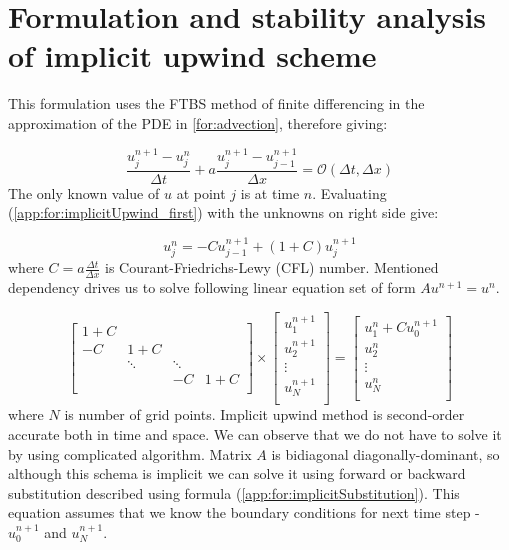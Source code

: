 \section{Formulation and stability analysis of implicit upwind scheme} \label{app:implicit}
	This formulation uses the FTBS method of finite differencing in the approximation of the PDE in \ref{for:advection}, therefore giving:
	
	\begin{equation}
		\label{app:for:implicitUpwind_first}
		\frac{u_j^{n+1} - u_j^n}{\Delta t} + a\frac{u_j^{n+1} - u_{j-1}^{n+1}}{\Delta x} = \mathcal{O}(\Delta t, \Delta x)
	\end{equation}	
	The only known value of $u$ at point $j$ is at time $n$. Evaluating (\ref{app:for:implicitUpwind_first}) with the unknowns on right side give:
	
	\begin{equation}
		\label{app:for:implicitUpwind_solution}
		u_j^n = -Cu_{j-1}^{n+1} + (1+C)u_j^{n+1}
	\end{equation}
	where $C=a\frac{\Delta t}{\Delta x}$ is Courant-Friedrichs-Lewy (CFL) number.
	Mentioned dependency drives us to solve following linear equation set of form $Au^{n+1} = u^n$.
	
	\begin{equation}
		\begin{bmatrix}
			1+C & & & \\
			-C & 1+C & & \\ 
			& \ddots & \ddots \\
			& & -C & 1+C \\					
		\end{bmatrix} 
		\times
		\begin{bmatrix}
			u_1^{n+1} \\
			u_2^{n+1} \\
			\vdots	\\
			u_N^{n+1}\\
		\end{bmatrix}
			=
		\begin{bmatrix}
			u_1^{n} + C u_0^{n+1}\\
			u_2^{n} \\
			\vdots	\\
			u_N^{n}\\
		\end{bmatrix}
	\end{equation} 	
	where $N$ is number of grid points.	
	Implicit upwind method is second-order accurate both in time and space. We can observe that we do not have to solve it by using complicated algorithm. Matrix $A$ is bidiagonal diagonally-dominant, so although this schema is implicit we can solve it using forward or backward substitution described using formula (\ref{app:for:implicitSubstitution}). This equation assumes that we know the boundary conditions for next time step - $u_0^{n+1}$ and $u_N^{n+1}$.
	
